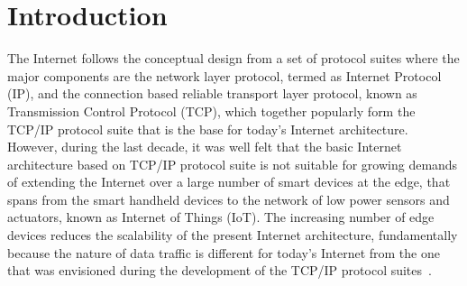 \section{Introduction}

The Internet follows the conceptual design from a set of protocol suites where the major components are the network layer protocol, termed as Internet Protocol (IP), and the connection based reliable transport layer protocol, known as Transmission Control Protocol (TCP), which together popularly form the TCP/IP protocol suite that is the base for today's Internet architecture. However, during the last decade, it was well felt that the basic Internet architecture based on TCP/IP protocol suite is not suitable for growing demands of extending the Internet over a large number of smart devices at the edge, that spans from the smart handheld devices to the network of low power sensors and actuators, known as Internet of Things (IoT). The increasing number of edge devices reduces the scalability of the present Internet architecture, fundamentally because the nature of data traffic is different for today's Internet from the one that was envisioned during the development of the TCP/IP protocol suites~\cite{rexford2010future,zhang2016smart}. 

